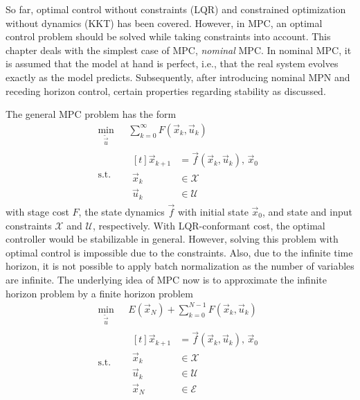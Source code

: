 	So far, optimal control without constraints (LQR) and constrained optimization without dynamics (KKT) has been covered. However, in MPC, an optimal control problem should be solved while taking constraints into account. This chapter deals with the simplest case of MPC, \emph{nominal} MPC. In nominal MPC, it is assumed that the model at hand is perfect, i.e., that the real system evolves exactly as the model predicts. Subsequently, after introducing nominal MPN and receding horizon control, certain properties regarding stability as discussed.

	The general MPC problem has the form
	\begin{align}
		\min_{\tilde{\vec{u}}}\; & \sum_{k = 0}^{\infty} F(\vec{x}_k, \vec{u}_k) \\
		\text{s.t.}\quad&
			\begin{aligned}[t]
				\vec{x}_{k + 1} &= \vec{f}(\vec{x}_k, \vec{u}_k),\, \vec{x}_0 \\
				\vec{x}_k &\in \mathcal{X} \\
				\vec{u}_k &\in \mathcal{U}
			\end{aligned}
	\end{align}
	with stage cost \(F\), the state dynamics \(\vec{f}\) with initial state \(\vec{x}_0\), and state and input constraints \(\mathcal{X}\) and \(\mathcal{U}\), respectively. With LQR-conformant cost, the optimal controller would be stabilizable in general. However, solving this problem with optimal control is impossible due to the constraints. Also, due to the infinite time horizon, it is not possible to apply batch normalization as the number of variables are infinite. The underlying idea of MPC now is to approximate the infinite horizon problem by a finite horizon problem
	\begin{equation}
		\begin{aligned}
			\min_{\tilde{\vec{u}}}\, & E(\vec{x}_N) + \sum_{k = 0}^{N - 1} F(\vec{x}_k, \vec{u}_k) \\
			\text{s.t.}\quad&
				\begin{aligned}[t]
					\vec{x}_{k + 1} &= \vec{f}(\vec{x}_k, \vec{u}_k),\, \vec{x}_0 \\
					\vec{x}_k &\in \mathcal{X} \\
					\vec{u}_k &\in \mathcal{U} \\
					\vec{x}_N &\in \mathcal{E}
				\end{aligned}
		\end{aligned}
		\label{eqn:recedingHorizon}
	\end{equation}
